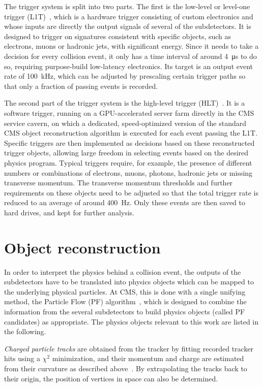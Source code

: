 The trigger system is split into two parts. The first is the low-level or level-one trigger (L1T)~\cite{CMS:TRG-17-001}, which is a hardware trigger consisting of custom electronics and whose inputs are directly the output signals of several of the subdetectors. It is designed to trigger on signatures consistent with specific objects, such as electrons, muons or hadronic jets, with significant energy. Since it needs to take a decision for every collision event, it only has a time interval of around \SI{4}{\micro\second} to do so, requiring purpose-build low-latency electronics. Its target is an output event rate of 100~kHz, which can be adjusted by prescaling certain trigger paths so that only a fraction of passing events is recorded.

The second part of the trigger system is the high-level trigger (HLT)~\cite{CMSTrigger:2005yhe,Varghese:20232Q}. It is a software trigger, running on a GPU-accelerated server farm directly in the CMS service cavern, on which a dedicated, speed-optimized version of the standard CMS object reconstruction algorithm is executed for each event passing the L1T. Specific triggers are then implemented as decisions based on these reconstructed trigger objects, allowing large freedom in selecting events based on the desired physics program. Typical triggers require, for example, the presence of different numbers or combinations of electrons, muons, photons, hadronic jets or missing transverse momentum. The transverse momentum thresholds and further requirements on these objects need to be adjusted so that the total trigger rate is reduced to an average of around 400~Hz. Only these events are then saved to hard drives, and kept for further analysis.

\section{Object reconstruction}
\label{sec:methods:reco}

In order to interpret the physics behind a collision event, the outputs of the subdetectors have to be translated into physics objects which can be mapped to the underlying physical particles. At CMS, this is done with a single unifying method, the Particle Flow (PF) algorithm~\cite{CMS:PRF-14-001}, which is designed to combine the information from the several subdetectors to build physics objects (called PF candidates) as appropriate. The physics objects relevant to this work are listed in the following.

\textit{Charged particle tracks} are obtained from the tracker by fitting recorded tracker hits using a $\chi^2$ minimization, and their momentum and charge are estimated from their curvature as described above~\cite{CMS:2014pgm}. 
By extrapolating the tracks back to their origin, the position of vertices in space can also be determined. 
    
